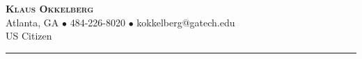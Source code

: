 \documentclass[9pt]{extarticle}
\begin{document}
\begin{center}
	{\fontsize{28}{33}\selectfont \textbf{\textsc{Klaus Okkelberg}}} \\[2pt]
	Atlanta, GA $\bullet$ 484-226-8020 $\bullet$ kokkelberg@gatech.edu \\[1pt]
	US Citizen \\[-7pt]
  \rule{\textwidth}{0.1pt}
\end{center}

\end{document}
